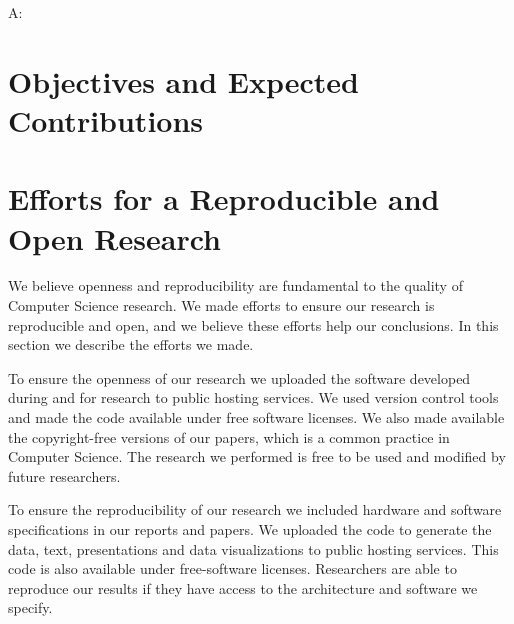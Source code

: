 %
%
%
%
%

A: \citet{bilmes1997optimizing}

\section{Objectives and Expected Contributions}
\label{sec:contributions}

\section{Efforts for a Reproducible and Open Research}

We believe openness and reproducibility are fundamental to the quality of
Computer Science research. We made efforts to ensure our research is
reproducible and open, and we believe these efforts help our conclusions.  In
this section we describe the efforts we made.

To ensure the openness of our research we uploaded the software developed
during and for research to public hosting services. We used version control
tools and made the code available under free software licenses. We also
made available the copyright-free versions of our papers, which is a common
practice in Computer Science. The research we performed is free to be used and
modified by future researchers.

To ensure the reproducibility of our research we included hardware and software
specifications in our reports and papers. We uploaded the code to generate the
data, text, presentations and data visualizations to public hosting services.
This code is also available under free-software licenses. Researchers are able
to reproduce our results if they have access to the architecture and software
we specify.

